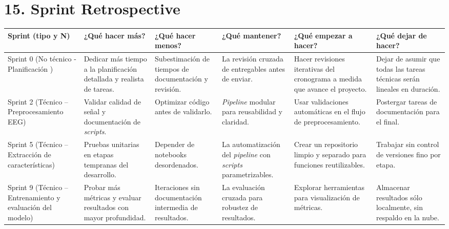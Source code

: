 \documentclass[
11pt, %
]{charter}
\begin{document}
\section{15. Sprint Retrospective}    
\label{sec:sprint_retro}
\begin{table}[H]
\centering
\renewcommand{\arraystretch}{1.5}
\begin{tabularx}{\textwidth}{|>{\centering\arraybackslash}m{2.8cm}|
								  >{\raggedright\arraybackslash}X|
								  >{\raggedright\arraybackslash}m{2.9cm}|
								  >{\raggedright\arraybackslash}X|
								  >{\raggedright\arraybackslash}X|
								  >{\raggedright\arraybackslash}X|}
\hline
\rowcolor[HTML]{C0C0C0}
\textbf{Sprint (tipo y N)} & \textbf{¿Qué hacer más?} & \textbf{¿Qué hacer menos?} & \textbf{¿Qué mantener?} & \textbf{¿Qué empezar a hacer?} & \textbf{¿Qué dejar de hacer?} \\
\hline
Sprint 0 (No técnico - Planificación ) &
Dedicar más tiempo a la planificación detallada y realista de tareas. &
Subestimación de tiempos de documentación y revisión. &
La revisión cruzada de entregables antes de enviar. &
Hacer revisiones iterativas del cronograma a medida que avance el proyecto. &
Dejar de asumir que todas las tareas técnicas serán lineales en duración. \\
\hline
Sprint 2 (Técnico – Preprocesamiento EEG) &
Validar calidad de señal y documentación de \textit{scripts}. &
Optimizar código antes de validarlo. &
\textit{Pipeline} modular para reusabilidad y claridad. &
Usar validaciones automáticas en el flujo de preprocesamiento. &
Postergar tareas de documentación para el final. \\
\hline
Sprint 5 (Técnico – Extracción de características) &
Pruebas unitarias en etapas tempranas del desarrollo. &
Depender de notebooks desordenados. &
La automatización del \textit{pipeline} con \textit{scripts} parametrizables. &
Crear un repositorio limpio y separado para funciones reutilizables. &
Trabajar sin control de versiones fino por etapa. \\
\hline
Sprint 9 (Técnico – Entrenamiento y evaluación del modelo) &
Probar más métricas y evaluar resultados con mayor profundidad. &
Iteraciones sin documentación intermedia de resultados. &
La evaluación cruzada para robustez de resultados. &
Explorar herramientas para visualización de métricas. &
Almacenar resultados sólo localmente, sin respaldo en la nube. \\
\hline
\end{tabularx}
\end{table}
\end{document}
